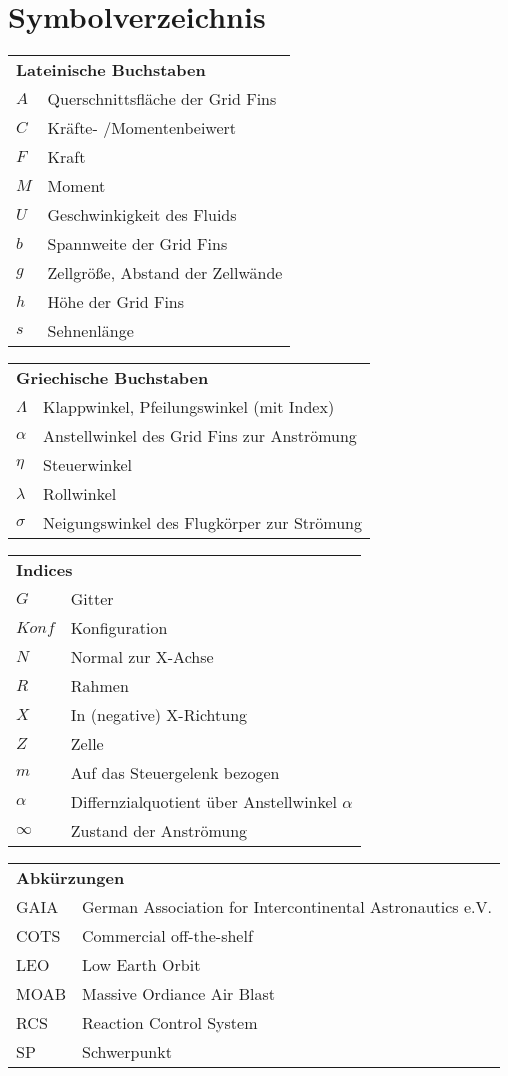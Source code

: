 \chapter*{Symbolverzeichnis}						%

\begin{longtable}[l]{ll}
\multicolumn{2}{l}{\textbf{Lateinische Buchstaben}}\\
$A$&Querschnittsfläche der Grid Fins\\
$C$&Kräfte- /Momentenbeiwert\\
$F$&Kraft\\
$M$&Moment\\
$U$&Geschwinkigkeit des Fluids\\
$b$&Spannweite der Grid Fins\\
$g$&Zellgröße, Abstand der Zellwände\\
$h$&Höhe der Grid Fins\\
$s$&Sehnenlänge\\
\end{longtable}


\begin{longtable}[l]{ll}
	\multicolumn{2}{l}{\textbf{Griechische Buchstaben}}\\
	$\Lambda$&Klappwinkel, Pfeilungswinkel (mit Index)\\
	$\alpha$&Anstellwinkel des Grid Fins zur Anströmung\\
	$\eta$&Steuerwinkel\\
	$\lambda$&Rollwinkel\\
	$\sigma$&Neigungswinkel des Flugkörper zur Strömung\\
\end{longtable}

\begin{longtable}[l]{ll}
	\multicolumn{2}{l}{\textbf{Indices}}\\
	$G$&Gitter\\
	$Konf$&Konfiguration\\
	$N$&Normal zur X-Achse\\
	$R$&Rahmen\\
	$X$&In (negative) X-Richtung\\
	$Z$&Zelle\\
	$m$&Auf das Steuergelenk bezogen\\
	$\alpha$&Differnzialquotient über Anstellwinkel $\alpha$\\
	$\infty$&Zustand der Anströmung\\
\end{longtable}

\begin{longtable}[l]{ll}
	\multicolumn{2}{l}{\textbf{Abkürzungen}}\\
	GAIA&German Association for Intercontinental Astronautics e.V.\\
	COTS&Commercial off-the-shelf\\
	LEO&Low Earth Orbit\\
	MOAB&Massive Ordiance Air Blast\\
	RCS&Reaction Control System\\
	SP&Schwerpunkt\\
\end{longtable}